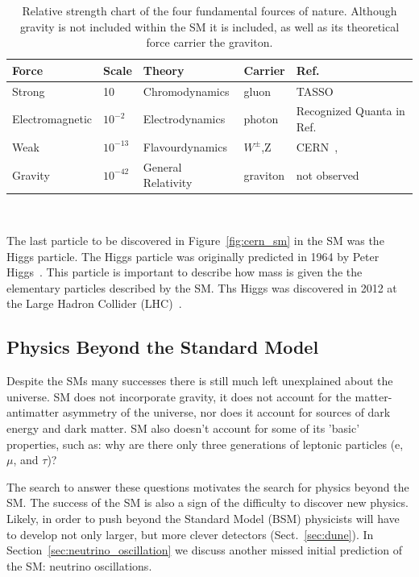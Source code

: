 \begin{table}
\begin{center}
\begin{tabular}{||p{30mm} p{20mm} p{40mm} p{25mm} p{35mm}||}
 \hline
 Force & Scale & Theory & Carrier & Ref. \\ [0.5ex]
 \hline\hline
 Strong & 10 & Chromodynamics & gluon & TASSO~\citep{tasso_1978_BRANDELIK1979243, PETRA_PhysRevLett.43.830} \\
 \hline
 Electromagnetic & $10^{-2} $ & Electrodynamics & photon & Recognized Quanta in Ref.~\citep{https://doi.org/10.1002/andp.19053220607} \\
 \hline
 Weak & $10^{-13}$ & Flavourdynamics & $W^{\pm}$,Z & CERN~\citep{wboson_measure_ARNISON1983103},\citep{zboson_measure_1983398}\\
 \hline
 Gravity & $10^{-42}$ & General Relativity & graviton  & not observed \\
 \hline
 \hline
\end{tabular}
\caption{Relative strength chart of the four fundamental fources of nature. 
Although gravity is not included within the SM it is included, as well as its theoretical force carrier the graviton.
}
\end{center}
\end{table}
~\label{table:forces}

The last particle to be discovered in Figure~\ref{fig:cern_sm} in the SM was the Higgs particle.
The Higgs particle was originally predicted in 1964 by Peter Higgs~\citep{HIGGS1964132}.
This particle is important to describe how mass is given the the elementary particles described by the SM.
Ths Higgs was discovered in 2012 at the Large Hadron Collider (LHC)~\citep{higgs_discovery_20121}.

\subsection{Physics Beyond the Standard Model}

Despite the SMs many successes there is still much left unexplained about the universe.
SM does not incorporate gravity, it does not account for the matter-antimatter asymmetry of the universe, nor does it account for sources of dark energy and dark matter.
SM also doesn't account for some of its 'basic' properties, such as: why are there only three generations of leptonic particles (e, $\mu$, and $\tau$)?

The search to answer these questions motivates the search for physics beyond the SM.
The success of the SM is also a sign of the difficulty to discover new physics.
Likely, in order to push beyond the Standard Model (BSM) physicists will have to develop not only larger, but more clever detectors (Sect.~\ref{sec:dune}).
In Section~\ref{sec:neutrino_oscillation} we discuss another missed initial prediction of the SM: neutrino oscillations. 

